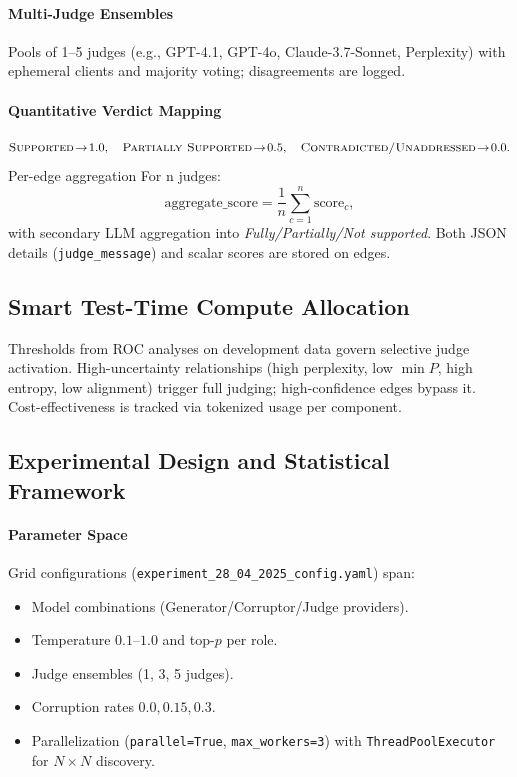 \paragraph{Multi-Judge Ensembles}
Pools of 1--5 judges (e.g., GPT-4.1, GPT-4o, Claude-3.7-Sonnet, Perplexity) with ephemeral clients and majority voting; disagreements are logged.

\paragraph{Quantitative Verdict Mapping}
\[
\textsc{Supported}\!\to\!1.0,\quad
\textsc{Partially Supported}\!\to\!0.5,\quad
\textsc{Contradicted/Unaddressed}\!\to\!0.0.
\]
Per-edge aggregation For n judges:
\[
\text{aggregate\_score}=\frac{1}{n}\sum_{c=1}^{n}\text{score}_c,
\]
with secondary LLM aggregation into \emph{Fully/Partially/Not supported}. Both JSON details (\texttt{judge\_message}) and scalar scores are stored on edges.

\subsection{Smart Test-Time Compute Allocation}

Thresholds from ROC analyses on development data govern selective judge activation. High-uncertainty relationships (high perplexity, low \(\min P\), high entropy, low alignment) trigger full judging; high-confidence edges bypass it. Cost-effectiveness is tracked via tokenized usage per component.

\subsection{Experimental Design and Statistical Framework}

\paragraph{Parameter Space}
Grid configurations (\texttt{experiment\_28\_04\_2025\_config.yaml}) span:
\begin{itemize}
  \item Model combinations (Generator/Corruptor/Judge providers).
  \item Temperature \(0.1\)–\(1.0\) and top-\(p\) per role.
  \item Judge ensembles (1, 3, 5 judges).
  \item Corruption rates \(0.0, 0.15, 0.3\).
  \item Parallelization (\texttt{parallel=True}, \texttt{max\_workers=3}) with \texttt{ThreadPoolExecutor} for \(N\times N\) discovery.
\end{itemize}

